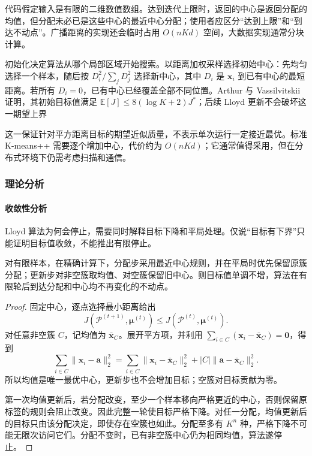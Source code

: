 代码假定输入是有限的二维数值数组。达到迭代上限时，返回的中心是返回分配的均值，但分配未必已是这些中心的最近中心分配；使用者应区分“达到上限”和“到达不动点”。广播距离的实现还会临时占用 $O(nKd)$ 空间，大数据实现通常分块计算。

初始化决定算法从哪个局部区域开始搜索。以距离加权采样选择初始中心：先均匀选择一个样本，随后按 $D_i^2/\sum_jD_j^2$ 选择新中心，其中 $D_i$ 是 $\bm{x}_i$ 到已有中心的最短距离。若所有 $D_i=0$，已有中心已经覆盖全部不同位置。Arthur 与 Vassilvitskii 证明，其初始目标值满足 $\mathbb{E}[J]\leq8(\log K+2)J^\ast$；后续 Lloyd 更新不会破坏这一期望上界

这一保证针对平方距离目标的期望近似质量，不表示单次运行一定接近最优。标准 K-means++ 需要逐个增加中心，代价约为 $O(nKd)$；它通常值得采用，但在分布式环境下仍需考虑扫描和通信。

\subsubsection{理论分析}

\paragraph{收敛性分析}
Lloyd 算法为何会停止，需要同时解释目标下降和平局处理。仅说“目标有下界”只能证明目标值收敛，不能推出有限停止。

\begin{theorem}
  \label{thm:clustering-lloyd}
  对有限样本，在精确计算下，分配步采用最近中心规则，并在平局时优先保留原簇分配；更新步对非空簇取均值、对空簇保留旧中心。则目标值单调不增，算法在有限轮后到达分配和中心均不再变化的不动点。
\end{theorem}
\begin{proof}
固定中心，逐点选择最小距离给出
\[
 J(\mathcal{P}^{(t+1)},\bm{\mu}^{(t)})
 \leq J(\mathcal{P}^{(t)},\bm{\mu}^{(t)}).
\]
对任意非空簇 $C$，记均值为 $\bar{\bm{x}}_C$。展开平方项，并利用 $\sum_{i\in C}(\bm{x}_i-\bar{\bm{x}}_C)=\bm{0}$，得到
\begin{equation}
 \sum_{i\in C}\lVert\bm{x}_i-\bm{a}\rVert_2^2
 =\sum_{i\in C}\lVert\bm{x}_i-\bar{\bm{x}}_C\rVert_2^2
   +|C|\lVert\bm{a}-\bar{\bm{x}}_C\rVert_2^2.
 \label{eq:clustering-mean-decomposition}
\end{equation}
所以均值是唯一最优中心，更新步也不会增加目标；空簇对目标贡献为零。

第一次均值更新后，若分配改变，至少一个样本移向严格更近的中心，否则保留原标签的规则会阻止改变。因此完整一轮使目标严格下降。对任一分配，均值更新后的目标只由该分配决定，即使存在空簇也如此。分配至多有 $K^n$ 种，严格下降不可能无限次访问它们。分配不变时，已有非空簇中心仍为相同均值，算法遂停止。
\end{proof}


